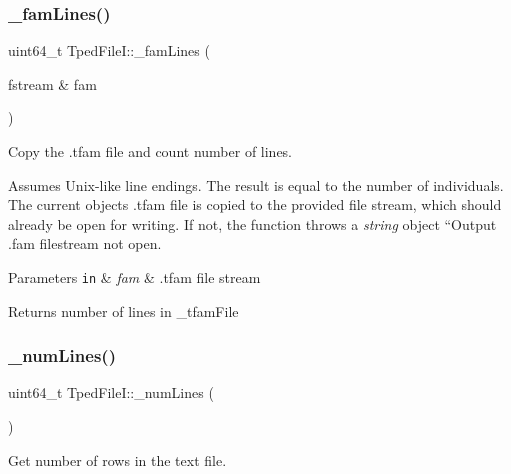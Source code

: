 \subsubsection{\texorpdfstring{\+\_\+fam\+Lines()}{\_famLines()}\hspace{0.1cm}{\footnotesize\ttfamily [2/2]}}
{\footnotesize\ttfamily uint64\+\_\+t Tped\+File\+I\+::\+\_\+fam\+Lines (\begin{DoxyParamCaption}\item[{fstream \&}]{fam }\end{DoxyParamCaption})\hspace{0.3cm}{\ttfamily [protected]}}



Copy the .tfam file and count number of lines. 

Assumes Unix-\/like line endings. The result is equal to the number of individuals. The current object\textquotesingle{}s .tfam file is copied to the provided file stream, which should already be open for writing. If not, the function throws a {\itshape string} object ``\+Output .fam filestream not open\textquotesingle{}\textquotesingle{}.


\begin{DoxyParams}[1]{Parameters}
\mbox{\tt in}  & {\em fam} & .tfam file stream\\
\hline
\end{DoxyParams}
\begin{DoxyReturn}{Returns}
number of lines in {\ttfamily \+\_\+tfam\+File} 
\end{DoxyReturn}
\mbox{\label{classsamp_files_1_1_tped_file_i_a83b4ec62cab76ae022be282b0ec357a6}} 
\subsubsection{\texorpdfstring{\+\_\+num\+Lines()}{\_numLines()}}
{\footnotesize\ttfamily uint64\+\_\+t Tped\+File\+I\+::\+\_\+num\+Lines (\begin{DoxyParamCaption}{ }\end{DoxyParamCaption})\hspace{0.3cm}{\ttfamily [protected]}}



Get number of rows in the text file. 

